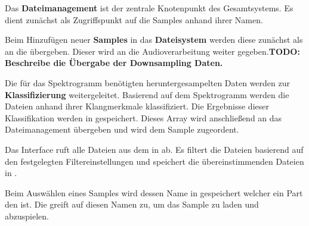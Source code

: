 Das \textbf{Dateimanagement} ist der zentrale Knotenpunkt des Gesamtsystems. Es dient zunächst als Zugriffspunkt auf die Samples anhand ihrer Namen. 

Beim Hinzufügen neuer \textbf{Samples} in das \textbf{Dateisystem} werden diese zunächst als  an die  übergeben. Dieser wird an die Audioverarbeitung weiter gegeben.\textbf{TODO: Beschreibe die Übergabe der Downsampling Daten.}

Die für das Spektrogramm benötigten heruntergesampelten Daten werden zur \textbf{Klassifizierung} weitergeleitet. Basierend auf dem Spektrogramm werden die Dateien anhand ihrer Klangmerkmale klassifiziert. Die Ergebnisse dieser Klassifikation werden in  gespeichert. Dieses Array wird anschließend an das Dateimanagement übergeben und wird dem Sample zugeordent.
 
Das Interface ruft alle Dateien aus dem  in  ab. Es filtert die Dateien basierend auf den festgelegten Filtereinstellungen und speichert die übereinstimmenden Dateien in .

Beim Auswählen eines Samples wird dessen Name in  gespeichert welcher ein Part den  ist. Die  greift auf diesen Namen zu, um das Sample zu laden und abzuspielen.

